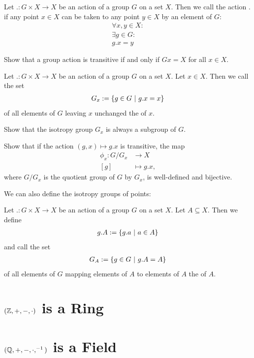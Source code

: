 \begin{definition}
	Let $. : G \times X \to X$ be an action of a group $G$ on a set $X$. Then we call the action $.$  if any point $x \in X$ can be taken to any point $y \in X$ by an element of $G$:
	\begin{align*}
		\forall x,y \in X :\\
		\exists g \in G:\\
		g.x = y
	\end{align*}
\end{definition}
\begin{exercise}
	Show that a group action is transitive if and only if $Gx = X$ for all $x \in X$.
\end{exercise}
\begin{definition}
	Let $. : G \times X \to X$ be an action of a group $G$ on a set $X$. Let $x \in X$. Then we call the set
	\begin{align*}
		G_x := \qty{g \in G ~\middle|~g.x = x}
	\end{align*}
	of all elements of $G$ leaving $x$ unchanged the  of $x$.
\end{definition}
\begin{exercise}
	Show that the isotropy group $G_x$ is always a subgroup of $G$.
\end{exercise}
\begin{exercise}
	Show that if the action $(g,x) \mapsto g.x$ is transitive, the map
	\begin{align*}
		\phi_x : G/G_x &\to X\\
		[g] &\mapsto g.x,
	\end{align*}
	where $G/G_x$ is the quotient group of $G$ by $G_x$, is well-defined and bijective.
\end{exercise}
We can also define the isotropy groups of points: 
\begin{definition}
	Let $. : G \times X \to X$ be an action of a group $G$ on a set $X$. Let $A \subseteq X$. Then we define
	\begin{align*}
		g.A := \qty{g.a ~\middle|~a \in A}
	\end{align*}
	and call the set
	\begin{align*}
		G_A := \qty{g \in G ~\middle|~g.A = A}
	\end{align*}
	of all elements of $G$ mapping elements of $A$ to elements of $A$ the  of $A$.
\end{definition}
\chapter{$(\mathbb{Z}, +, -, \cdot)$ is a Ring}
\chapter{$(\mathbb{Q}, +, -, \cdot, ^{-1})$ is a Field}
